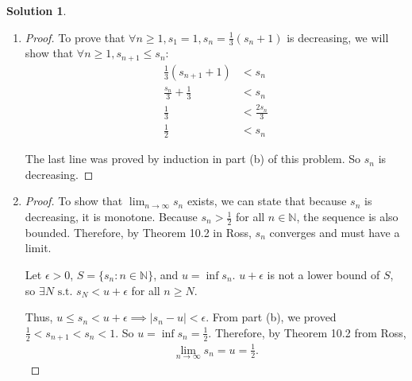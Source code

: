 \documentclass[12pt]{article}
\theoremstyle{definition} %
\newtheorem{solution}{Solution}
\theoremstyle{plain} %
\begin{document}
\begin{solution}
\begin{enumerate}
\begin{proof}
            To finish the proof, we need $\frac{1}{3}(s_{n+1} + 1) > \frac{1}{2}$:
            \begin{align}
                \frac{s_{n+1}}{3} - \frac{1}{6} &> 0 \tag{59} \\
                \frac{1}{6}(2s_{n+1} - 1) &> 0 \tag{60} \\
                s_{n+1} &> \frac{1}{2} \tag{61}
            \end{align}
        \end{proof}
        \item \begin{proof}
            To prove that $\forall n \geq 1, s_1 = 1, s_n = \frac{1}{3}(s_n + 1)$ is decreasing, we will show that $\forall n \geq 1, s_{n+1} \leq s_n$:
            \begin{align}
                \frac{1}{3}(s_{n+1} + 1) &< s_n \tag{62} \\
                \frac{s_n}{3} + \frac{1}{3} &< s_n \tag{63} \\
                \frac{1}{3} &< \frac{2s_n}{3} \tag{64} \\
                \frac{1}{2} &< s_n \tag{65}
            \end{align}
        
            The last line was proved by induction in part (b) of this problem. So $s_n$ is decreasing. 
        \end{proof}
        \item \begin{proof}
            To show that $\lim_{n \to \infty} s_n$ exists, we can state that because $s_n$ is decreasing, it is monotone. Because $s_n > \frac{1}{2}$ for all $n \in \mathbb{N}$, the sequence is also bounded. Therefore, by Theorem 10.2 in Ross, $s_n$ converges and must have a limit.
        
            Let $\epsilon > 0$, $S = \{s_n : n \in \mathbb{N}\}$, and $u = \inf s_n$. $u + \epsilon$ is not a lower bound of $S$, so $\exists N \text{ s.t. } s_N < u + \epsilon$ for all $n \geq N$.
        
            Thus, $u \leq s_n < u + \epsilon \implies |s_n - u| < \epsilon$. From part (b), we proved $\frac{1}{2} < s_{n+1} < s_n < 1$. So $u = \inf s_n = \frac{1}{2}$. Therefore, by Theorem 10.2 from Ross, 
            \begin{align}
            \lim_{n \to \infty} s_n = u = \frac{1}{2}.
            \end{align}
            
        \end{proof}
    \end{enumerate}
\end{solution}
\end{document}
